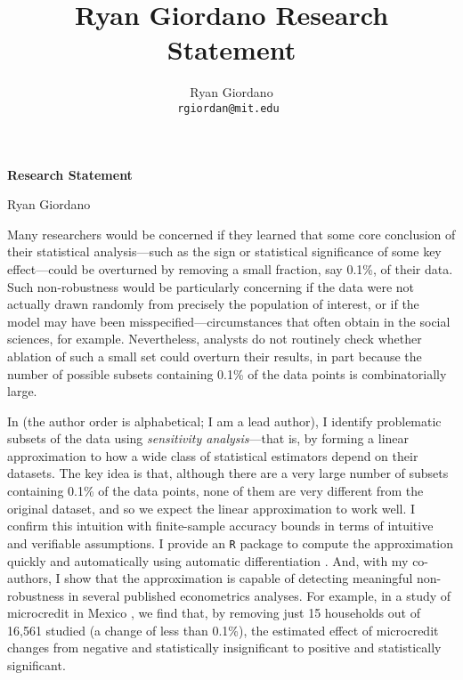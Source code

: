 
\usepackage{enumitem}

\usepackage{geometry}
\geometry{top=0.8in}
\geometry{left=1.1in}
\geometry{right=1.1in}

\title{Ryan Giordano Research Statement}

\author{
  Ryan Giordano \\ \texttt{rgiordan@mit.edu }
}



\begin{minipage}[t]{0.5\textwidth}
\hspace{-2em} %
{\bf \LARGE Research Statement}\\
\end{minipage}
\begin{minipage}[t]{0.5\textwidth}
        \hspace{8em} %
        {\LARGE Ryan Giordano}
\end{minipage}

Many researchers would be concerned if they learned that some core conclusion of
their statistical analysis---such as the sign or statistical significance of some
key effect---could be overturned by removing a small fraction, say 0.1\%, of
their data.  Such non-robustness would be particularly concerning if the data
were not actually drawn randomly from precisely the population of interest, or if
the model may have been misspecified---circumstances that often obtain in  the
social sciences, for example.  Nevertheless, analysts do not routinely check
whether ablation of such a small set could overturn their results, in part
because the number of possible subsets containing 0.1\% of the data points is
combinatorially large.

In \citet{giordano:2020:amip} (the author order is alphabetical; I am a lead
author), I identify problematic subsets of the data using {\em sensitivity
analysis}---that is, by forming a linear approximation to how a wide class of
statistical estimators depend on their datasets.  The key idea is that, although
there are a very large number of subsets containing 0.1\% of the data points,
none of them are very different from the original dataset, and so we expect the
linear approximation to work well.  I confirm this intuition with finite-sample
accuracy bounds in terms of intuitive and verifiable assumptions.  I provide an
\texttt{R} package \citep{zaminfluence} to compute the approximation quickly and
automatically using automatic differentiation \citep{baydin:2015:automatic,
autograd}.  And, with my co-authors, I show that the approximation is capable of
detecting meaningful non-robustness in several published econometrics analyses.
For example, in a study of microcredit in Mexico
\citep{angelucci:2015:microcredit}, we find that, by removing just 15 households
out of 16,561 studied (a change of less than 0.1\%), the estimated effect of
microcredit changes from negative and statistically insignificant to positive
and statistically significant.

